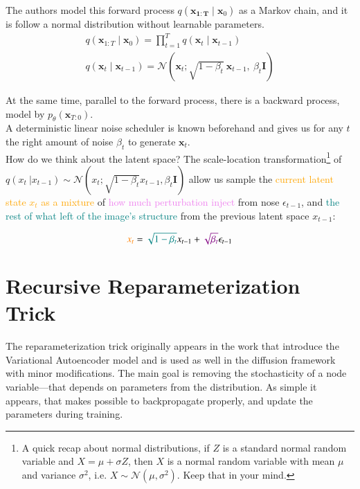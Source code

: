 The authors model this forward process $q(\mathbf{x_{1:T}}\mid\mathbf{x}_{0})$ as a Markov chain, and it
is follow a normal distribution without learnable 
parameters.
\begin{align}
q(\mathbf{x}_{1:T}\mid\mathbf{x}_0) = \prod_{t=1}^{T}q(\mathbf{x}_t\mid\mathbf{x}_{t-1})
\\
q(\mathbf{x}_t\mid\mathbf{x}_{t-1}) = \mathcal{N}(\mathbf{x}_t;\sqrt{1-\beta_{t}}~\mathbf{x}_{t-1},~ \beta_{t}\mathbf{I})
\end{align}

At the same time, parallel to the forward process, there is
a backward process, model by $p_{\theta}(\mathbf{x}_{T:0})$.\\

A deterministic linear noise scheduler is known beforehand and gives us for any $t$ the right amount of noise $\beta_{t}$ to generate $\mathbf{x}_{t}$. \\

How do we think about the latent space? The scale-location transformation\footnote{A quick recap about normal distributions, if $Z$ is a standard normal random variable and $X=\mu + \sigma Z$, then $X$ is a normal random variable with mean $\mu$ and
variance $\sigma^2$, i.e. $X\sim\mathcal{N}(\mu, \sigma^2)$.
Keep that in your mind.} of $q(x_{t}~|x_{t-1})\sim\mathcal{N}(x_{t}; \sqrt{1-\beta_{t}} x_{t-1}, \beta_{t}\mathbf{I})$ allow us sample the \textcolor{orange}{current latent state $x_{t}$ as a mixture} of \textcolor{violet}{how
much perturbation inject} from nose $\epsilon_{t-1}$, and \textcolor{teal}{the rest of what left of the image's structure} from the previous latent space $x_{t-1}:$

$$
\textcolor{orange}{x_{t}} = \textcolor{teal}{\sqrt{1-\beta_{t}}} x_{t-1} + \textcolor{violet}{\sqrt{\beta_{t}}}\epsilon_{t-1}
$$

\section{Recursive Reparameterization Trick}

The reparameterization trick originally appears in the work that introduce the Variational Autoencoder model \cite{kingma2013auto} and is used as well in the diffusion framework with minor modifications. The main goal is removing the stochasticity of a node variable---that depends on parameters from the distribution. As simple it appears, that makes possible to backpropagate properly, and update the parameters during training. \\

